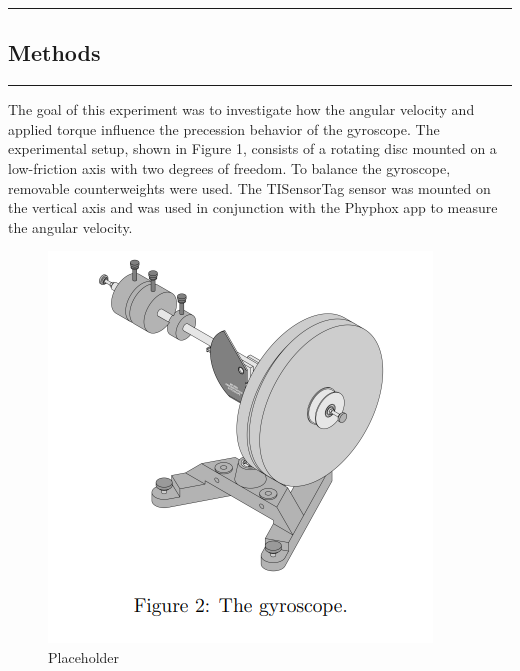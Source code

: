 {\color{gray}\hrule}
\begin{center}
\section{Methods} \label{sec:methods}
\end{center}
{\color{gray}\hrule}

\begin{multicols}{2}
The goal of this experiment was to investigate how the angular velocity and applied torque influence the precession behavior of the gyroscope. The experimental setup, shown in Figure 1, consists of a rotating disc mounted on a low-friction axis with two degrees of freedom. To balance the gyroscope, removable counterweights were used. The TISensorTag sensor was mounted on the vertical axis and was used in conjunction with the Phyphox app to measure the angular velocity.

\begin{figure}[H]
    \centering
    \includegraphics[width=\columnwidth]{gyroscope/images/setup}
    \caption{Placeholder}
    \label{setep}
\end{figure}


\end{multicols}
